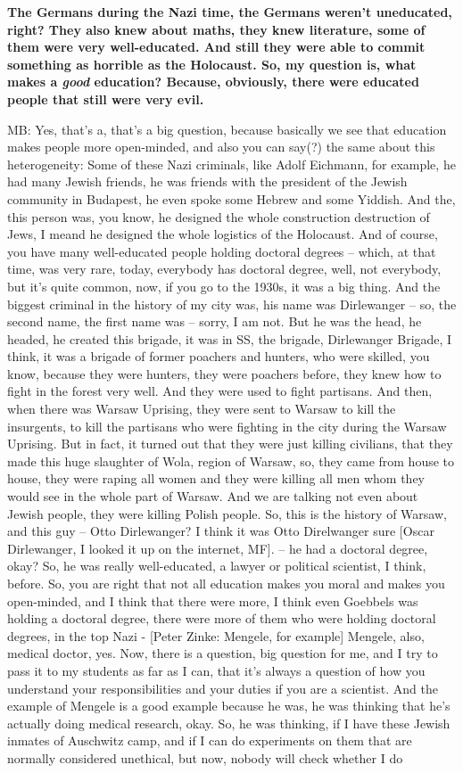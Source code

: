 \textbf{The Germans during the Nazi time, the Germans weren’t uneducated, right? They also knew about maths, they knew literature, some of them were very well-educated. And still they were able to commit something as horrible as the Holocaust. So, my question is, what makes a \textit{good} education? Because, obviously, there were educated people that still were very evil.}

MB: Yes, that’s a, that’s a big question, because basically we see that education makes people more open-minded, and also you can say(?) the same about this heterogeneity: Some of these Nazi criminals, like Adolf Eichmann, for example, he had many Jewish friends, he was friends with the president of the Jewish community in Budapest, he even spoke some Hebrew and some Yiddish. And the, this person was, you know, he designed the whole construction destruction of Jews, I meand he designed the whole logistics of the Holocaust. And of course, you have many well-educated people holding doctoral degrees – which, at that time, was very rare, today, everybody has doctoral degree, well, not everybody, but it’s quite common, now, if you go to the 1930s, it was a big thing. And the biggest criminal in the history of my city was, his name was Dirlewanger – so, the second name, the first name was – sorry, I am not. But he was the head, he headed, he created this brigade, it was in SS, the brigade, Dirlewanger Brigade, I think, it was a brigade of former poachers and hunters, who were skilled, you know, because they were hunters, they were poachers before, they knew how to fight in the forest very well. And they were used to fight partisans. And then, when there was Warsaw Uprising, they were sent to Warsaw to kill the insurgents, to kill the partisans who were fighting in the city during the Warsaw Uprising. But in fact, it turned out that they were just killing civilians, that they made this huge slaughter of Wola, region of Warsaw, so, they came from house to house, they were raping all women and they were killing all men whom they would see in the whole part of Warsaw. And we are talking not even about Jewish people, they were killing Polish people. So, this is the history of Warsaw, and this guy – Otto Dirlewanger? I think it was Otto Direlwanger sure [Oscar Dirlewanger, I looked it up on the internet, MF]. – he had a doctoral degree, okay? So, he was really well-educated, a lawyer or political scientist, I think, before. So, you are right that not all education makes you moral and makes you open-minded, and I think that there were more, I think even Goebbels was holding a doctoral degree, there were more of them who were holding doctoral degrees, in the top Nazi - [Peter Zinke: Mengele, for example] Mengele, also, medical doctor, yes. Now, there is a question, big question for me, and I try to pass it to my students as far as I can, that it’s always a question of how you understand your responsibilities and your duties if you are a scientist. And the example of Mengele is a good example because he was, he was thinking that he’s actually doing medical research, okay. So, he was thinking, if I have these Jewish inmates of Auschwitz camp, and if I can do experiments on them that are normally considered unethical, but now, nobody will check whether I do 